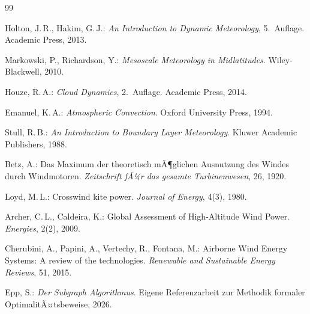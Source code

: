﻿\documentclass[a4paper,12pt]{article}
\theoremstyle{definition}
\begin{document}
\begin{thebibliography}{99}

Holton, J.\,R., Hakim, G.\,J.:
\emph{An Introduction to Dynamic Meteorology}, 5.\ Auflage.
Academic Press, 2013.

Markowski, P., Richardson, Y.:
\emph{Mesoscale Meteorology in Midlatitudes}.
Wiley-Blackwell, 2010.

Houze, R.\,A.:
\emph{Cloud Dynamics}, 2.\ Auflage.
Academic Press, 2014.

Emanuel, K.\,A.:
\emph{Atmospheric Convection}.
Oxford University Press, 1994.

Stull, R.\,B.:
\emph{An Introduction to Boundary Layer Meteorology}.
Kluwer Academic Publishers, 1988.

Betz, A.:
Das Maximum der theoretisch mÃ¶glichen Ausnutzung des Windes durch
Windmotoren.
\emph{Zeitschrift fÃ¼r das gesamte Turbinenwesen}, 26, 1920.

Loyd, M.\,L.:
Crosswind kite power.
\emph{Journal of Energy}, 4(3), 1980.

Archer, C.\,L., Caldeira, K.:
Global Assessment of High-Altitude Wind Power.
\emph{Energies}, 2(2), 2009.

Cherubini, A., Papini, A., Vertechy, R., Fontana, M.:
Airborne Wind Energy Systems: A review of the technologies.
\emph{Renewable and Sustainable Energy Reviews}, 51, 2015.

Epp, S.:
\emph{Der Subgraph Algorithmus}.
Eigene Referenzarbeit zur Methodik formaler OptimalitÃ¤tsbeweise, 2026.

\end{thebibliography}
\end{document}
